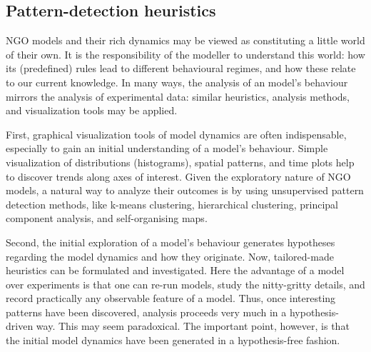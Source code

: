 \subsection{Pattern-detection heuristics}

NGO models and their rich dynamics may be viewed as constituting a little world of their own. It is the responsibility of the modeller to understand this world: how its (predefined) rules lead to different behavioural regimes, and how these relate to our current knowledge. In many ways, the analysis of an model's behaviour mirrors the analysis of experimental data: similar heuristics, analysis methods, and visualization tools may be applied.

First, graphical visualization tools of model dynamics are often indispensable, especially to gain an initial understanding of a model's behaviour. Simple visualization of distributions (histograms), spatial patterns, and time plots help to discover trends along axes of interest. Given the exploratory nature of NGO models, a natural way to analyze their outcomes is by using unsupervised pattern detection methods, like k-means clustering, hierarchical clustering, principal component analysis, and self-organising maps. 

Second, the initial exploration of a model's behaviour generates hypotheses regarding the model dynamics and how they originate. Now, tailored-made heuristics can be formulated and investigated. Here the advantage of a model over experiments is that one can re-run models, study the nitty-gritty details, and record practically any observable feature of a model. Thus, once interesting patterns have been discovered, analysis proceeds very much in a hypothesis-driven way. This may seem paradoxical. The important point, however, is that the initial model dynamics have been generated in a hypothesis-free fashion.
